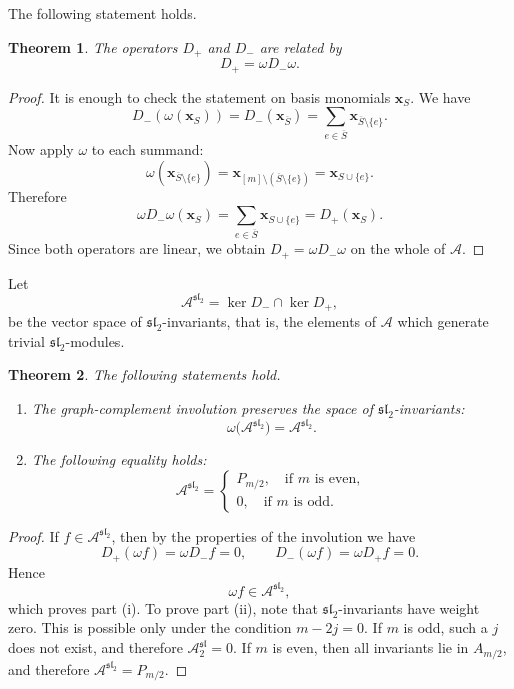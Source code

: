 \documentclass[10pt,a4paper]{amsart}
\newtheorem{theorem}{Theorem}[section]
\begin{document}
The following statement holds.
\begin{theorem}
The operators $D_+$ and $D_-$ are related by
$$
D_+=\omega D_-\omega.
$$
\end{theorem}

\begin{proof}
It is enough to check the statement on basis monomials $\boldsymbol{x}_S$.
We have
$$
D_-(\omega(\boldsymbol{x}_S))=D_-(\boldsymbol{x}_{\overline S})
=
\sum_{e\in \overline S}\boldsymbol{x}_{\overline S\setminus\{e\}}.
$$
Now apply $\omega$ to each summand:
$$
\omega\!\left(\boldsymbol{x}_{\overline S\setminus\{e\}}\right)
=
\boldsymbol{x}_{[m]\setminus(\overline S\setminus\{e\})}
=
\boldsymbol{x}_{S\cup\{e\}}.
$$
Therefore
$$
\omega D_-\omega(\boldsymbol{x}_S)
=
\sum_{e\in \overline S}\boldsymbol{x}_{S\cup\{e\}}
=
D_+(\boldsymbol{x}_S).
$$
Since both operators are linear, we obtain
$
D_+=\omega D_-\omega
$
on the whole of $\mathcal A$.
\end{proof}

Let
$$
\mathcal A^{\mathfrak{sl}_2}=\ker D_-\cap \ker D_+,
$$
be the vector space of $\mathfrak{sl}_2$-invariants, that is, the elements of
$\mathcal A$ which generate trivial $\mathfrak{sl}_2$-modules.


\begin{theorem}
The following statements hold.
\begin{enumerate}
\item[\textnormal{(i)}] The graph-complement involution preserves the space of
$\mathfrak{sl}_2$-invariants:
$$
\omega\bigl(\mathcal A^{\mathfrak{sl}_2}\bigr)
=
\mathcal A^{\mathfrak{sl}_2}.
$$

\item[\textnormal{(ii)}]
The following equality holds:
$$
\mathcal A^{\mathfrak{sl}_2}=
\begin{cases}
P_{m/2}, \quad \text{if $m$ is even},\\
0, \quad \text{if $m$ is odd}.
\end{cases}
$$
\end{enumerate}
\end{theorem}

\begin{proof}
If $f\in\mathcal A^{\mathfrak{sl}_2}$, then by the properties of the
involution we have
$$
D_+(\omega f)=\omega D_-f=0,
\qquad
D_-(\omega f)=\omega D_+f=0.
$$
Hence
$$
\omega f\in\mathcal A^{\mathfrak{sl}_2},
$$
which proves part \textnormal{(i)}.
To prove part \textnormal{(ii)}, note that $\mathfrak{sl}_2$-invariants have
weight zero. This is possible only under the condition
$
m-2j=0.
$
If $m$ is odd, such a $j$ does not exist, and therefore
$\mathcal A^\mathfrak{sl}_2=0$.
If $m$ is even, then all invariants lie in $A_{m/2}$, and therefore
$\mathcal A^{\mathfrak{sl}_2}=P_{m/2}$.
\end{proof}
\end{document}
